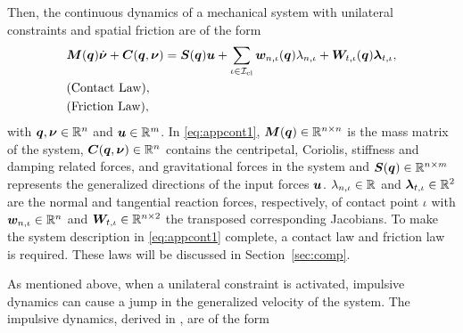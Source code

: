 \documentclass[../DC2017114Bouma.tex]{subfiles}
\begin{document}
Then, the continuous dynamics of a mechanical system with unilateral constraints and spatial friction are of the form
\begin{align}
&{\boldsymbol{M}}({\boldsymbol{q}})\dot{\boldsymbol{\nu}} + {\boldsymbol{C}}({\boldsymbol{q}},\boldsymbol{\nu}) = {\boldsymbol{S}}({\boldsymbol{q}}){\boldsymbol{u}} + \sum_{\iota\in\mathcal{I}_{\text{cl}}}{\boldsymbol{w}}_{n,\iota}({\boldsymbol{q}})\lambda_{n,\iota} + {\boldsymbol{W}}_{t,\iota}({\boldsymbol{q}})\boldsymbol{\lambda}_{t,\iota}, \label{eq:appcont1}\\
&\text{(Contact Law)},\nonumber\\
&\text{(Friction Law)},\nonumber
\end{align}
%
%
%
%
%
%
%
with ${\boldsymbol{q}},\boldsymbol{\nu}\in\mathbb{R}^{n}$ and ${\boldsymbol{u}}\in\mathbb{R}^m$. In \eqref{eq:appcont1}, ${\boldsymbol{M}}({\boldsymbol{q}})\in\mathbb{R}^{n\times n}$ is the mass matrix of the system, ${\boldsymbol{C}}({\boldsymbol{q}},\boldsymbol{\nu})\in\mathbb{R}^{n}$ contains the centripetal, Coriolis, stiffness and damping related forces, and gravitational forces in the system and ${\boldsymbol{S}}({\boldsymbol{q}})\in\mathbb{R}^{n\times m}$ represents the generalized directions of the input forces ${\boldsymbol{u}}$. $\lambda_{n,\iota}\in\mathbb{R}$ and $\boldsymbol{\lambda}_{t,\iota}\in\mathbb{R}^{2}$ are the normal and tangential reaction forces, respectively, of contact point $\iota$ with ${\boldsymbol{w}}_{n,\iota}\in\mathbb{R}^{n}$ and ${\boldsymbol{W}}_{t,\iota}\in\mathbb{R}^{n\times 2}$ the transposed corresponding Jacobians. To make the system description in \eqref{eq:appcont1} complete, a contact law and friction law is required. These laws will be discussed in Section~\ref{sec:comp}.

As mentioned above, when a unilateral constraint is activated, impulsive dynamics can cause a jump in the generalized velocity of the system. The impulsive dynamics, derived in \cite[Section 5.4]{Leine2008}, are of the form
\end{document}
